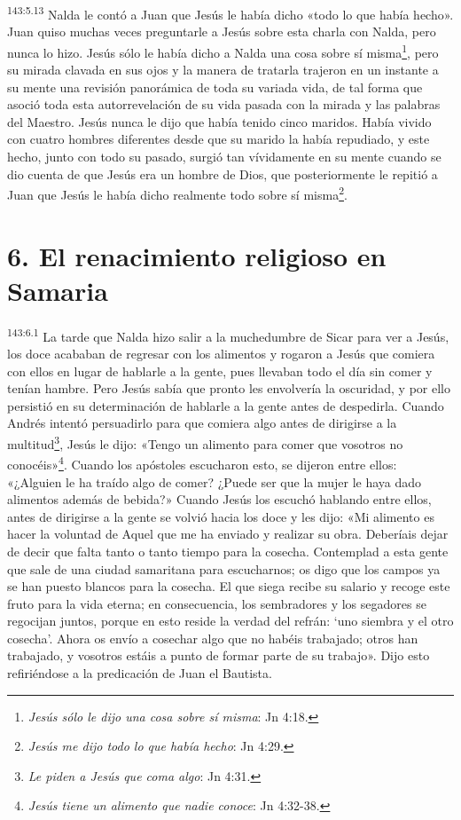\par 
\textsuperscript{143:5.13} Nalda le contó a Juan que Jesús le había dicho «todo lo que había hecho». Juan quiso muchas veces preguntarle a Jesús sobre esta charla con Nalda, pero nunca lo hizo. Jesús sólo le había dicho a Nalda una cosa sobre sí misma\footnote{\textit{Jesús sólo le dijo una cosa sobre sí misma}: Jn 4:18.}, pero su mirada clavada en sus ojos y la manera de tratarla trajeron en un instante a su mente una revisión panorámica de toda su variada vida, de tal forma que asoció toda esta autorrevelación de su vida pasada con la mirada y las palabras del Maestro. Jesús nunca le dijo que había tenido cinco maridos. Había vivido con cuatro hombres diferentes desde que su marido la había repudiado, y este hecho, junto con todo su pasado, surgió tan vívidamente en su mente cuando se dio cuenta de que Jesús era un hombre de Dios, que posteriormente le repitió a Juan que Jesús le había dicho realmente todo sobre sí misma\footnote{\textit{Jesús me dijo todo lo que había hecho}: Jn 4:29.}.

\section*{6. El renacimiento religioso en Samaria}
\par 
\textsuperscript{143:6.1} La tarde que Nalda hizo salir a la muchedumbre de Sicar para ver a Jesús, los doce acababan de regresar con los alimentos y rogaron a Jesús que comiera con ellos en lugar de hablarle a la gente, pues llevaban todo el día sin comer y tenían hambre. Pero Jesús sabía que pronto les envolvería la oscuridad, y por ello persistió en su determinación de hablarle a la gente antes de despedirla. Cuando Andrés intentó persuadirlo para que comiera algo antes de dirigirse a la multitud\footnote{\textit{Le piden a Jesús que coma algo}: Jn 4:31.}, Jesús le dijo: «Tengo un alimento para comer que vosotros no conocéis»\footnote{\textit{Jesús tiene un alimento que nadie conoce}: Jn 4:32-38.}. Cuando los apóstoles escucharon esto, se dijeron entre ellos: «¿Alguien le ha traído algo de comer? ¿Puede ser que la mujer le haya dado alimentos además de bebida?» Cuando Jesús los escuchó hablando entre ellos, antes de dirigirse a la gente se volvió hacia los doce y les dijo: «Mi alimento es hacer la voluntad de Aquel que me ha enviado y realizar su obra. Deberíais dejar de decir que falta tanto o tanto tiempo para la cosecha. Contemplad a esta gente que sale de una ciudad samaritana para escucharnos; os digo que los campos ya se han puesto blancos para la cosecha. El que siega recibe su salario y recoge este fruto para la vida eterna; en consecuencia, los sembradores y los segadores se regocijan juntos, porque en esto reside la verdad del refrán: `uno siembra y el otro cosecha'. Ahora os envío a cosechar algo que no habéis trabajado; otros han trabajado, y vosotros estáis a punto de formar parte de su trabajo». Dijo esto refiriéndose a la predicación de Juan el Bautista.

